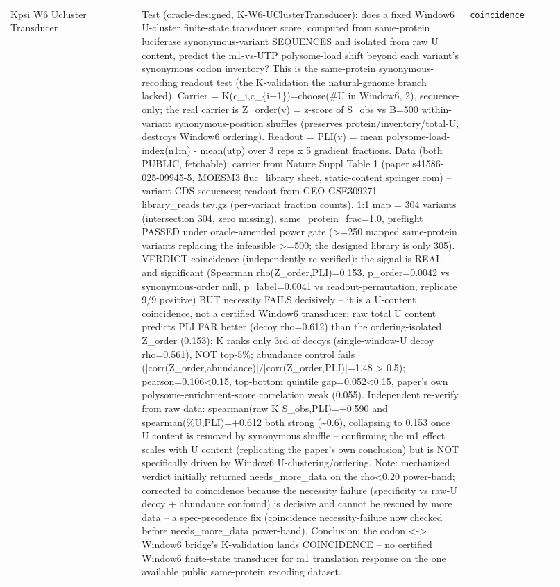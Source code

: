 \begin{longtable}{>{\raggedright\arraybackslash}p{0.22\linewidth}>{\raggedright\arraybackslash}p{0.55\linewidth}>{\raggedright\arraybackslash}p{0.15\linewidth}}
Kpsi W6 Ucluster Transducer & Test (oracle-designed, K-W6-UClusterTransducer): does a fixed Window6 U-cluster finite-state transducer score, computed from same-protein luciferase synonymous-variant SEQUENCES and isolated from raw U content, predict the m1-vs-UTP polysome-load shift beyond each variant's synonymous codon inventory? This is the same-protein synonymous-recoding readout test (the K-validation the natural-genome branch lacked). Carrier = K(c\_i,c\_\{i+1\})=choose(\#U in Window6, 2), sequence-only; the real carrier is Z\_order(v) = z-score of S\_obs vs B=500 within-variant synonymous-position shuffles (preserves protein/inventory/total-U, destroys Window6 ordering). Readout = PLI(v) = mean polysome-load-index(n1m) - mean(utp) over 3 reps x 5 gradient fractions. Data (both PUBLIC, fetchable): carrier from Nature Suppl Table 1 (paper s41586-025-09945-5, MOESM3 fluc\_library sheet, static-content.springer.com) -- variant CDS sequences; readout from GEO GSE309271 library\_reads.tsv.gz (per-variant fraction counts). 1:1 map = 304 variants (intersection 304, zero missing), same\_protein\_frac=1.0, preflight PASSED under oracle-amended power gate (>=250 mapped same-protein variants replacing the infeasible >=500; the designed library is only 305). VERDICT coincidence (independently re-verified): the signal is REAL and significant (Spearman rho(Z\_order,PLI)=0.153, p\_order=0.0042 vs synonymous-order null, p\_label=0.0041 vs readout-permutation, replicate 9/9 positive) BUT necessity FAILS decisively -- it is a U-content coincidence, not a certified Window6 transducer: raw total U content predicts PLI FAR better (decoy rho=0.612) than the ordering-isolated Z\_order (0.153); K ranks only 3rd of decoys (single-window-U decoy rho=0.561), NOT top-5\%; abundance control fails (|corr(Z\_order,abundance)|/|corr(Z\_order,PLI)|=1.48 > 0.5); pearson=0.106<0.15, top-bottom quintile gap=0.052<0.15, paper's own polysome-enrichment-score correlation weak (0.055). Independent re-verify from raw data: spearman(raw K S\_obs,PLI)=+0.590 and spearman(\%U,PLI)=+0.612 both strong (\textasciitilde{}0.6), collapsing to 0.153 once U content is removed by synonymous shuffle -- confirming the m1 effect scales with U content (replicating the paper's own conclusion) but is NOT specifically driven by Window6 U-clustering/ordering. Note: mechanized verdict initially returned needs\_more\_data on the rho<0.20 power-band; corrected to coincidence because the necessity failure (specificity vs raw-U decoy + abundance confound) is decisive and cannot be rescued by more data -- a spec-precedence fix (coincidence necessity-failure now checked before needs\_more\_data power-band). Conclusion: the codon <-> Window6 bridge's K-validation lands COINCIDENCE -- no certified Window6 finite-state transducer for m1 translation response on the one available public same-protein recoding dataset. & \texttt{coincidence} \\

\end{longtable}
